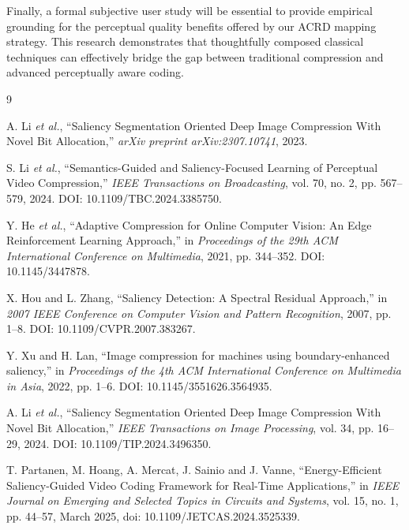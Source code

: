 \documentclass[11pt,                                                             
 superscriptaddress,twoside,
 amsmath,amssymb,
 aps, physrev
]{revtex4-2}
\begin{document}
Finally, a formal subjective user study will be essential to provide empirical grounding for the perceptual quality benefits offered by our ACRD mapping strategy. This research demonstrates that thoughtfully composed classical techniques can effectively bridge the gap between traditional compression and advanced perceptually aware coding.

\begin{thebibliography}{9}

A. Li \emph{et al.}, ``Saliency Segmentation Oriented Deep Image Compression With Novel Bit Allocation,'' \emph{arXiv preprint arXiv:2307.10741}, 2023.

S. Li \emph{et al.}, ``Semantics-Guided and Saliency-Focused Learning of Perceptual Video Compression,'' \emph{IEEE Transactions on Broadcasting}, vol. 70, no. 2, pp. 567--579, 2024. DOI: 10.1109/TBC.2024.3385750.

Y. He \emph{et al.}, ``Adaptive Compression for Online Computer Vision: An Edge Reinforcement Learning Approach,'' in \emph{Proceedings of the 29th ACM International Conference on Multimedia}, 2021, pp. 344--352. DOI: 10.1145/3447878.

X. Hou and L. Zhang, ``Saliency Detection: A Spectral Residual Approach,'' in \emph{2007 IEEE Conference on Computer Vision and Pattern Recognition}, 2007, pp. 1--8. DOI: 10.1109/CVPR.2007.383267.

Y. Xu and H. Lan, ``Image compression for machines using boundary-enhanced saliency,'' in \emph{Proceedings of the 4th ACM International Conference on Multimedia in Asia}, 2022, pp. 1--6. DOI: 10.1145/3551626.3564935.

A. Li \emph{et al.}, ``Saliency Segmentation Oriented Deep Image Compression With Novel Bit Allocation,'' \emph{IEEE Transactions on Image Processing}, vol. 34, pp. 16--29, 2024. DOI: 10.1109/TIP.2024.3496350.

T. Partanen, M. Hoang, A. Mercat, J. Sainio and J. Vanne, ``Energy-Efficient Saliency-Guided Video Coding Framework for Real-Time Applications,'' in \emph{IEEE Journal on Emerging and Selected Topics in Circuits and Systems}, vol. 15, no. 1, pp. 44--57, March 2025, doi: 10.1109/JETCAS.2024.3525339.

\end{thebibliography}
\end{document}
